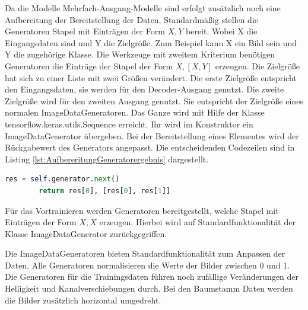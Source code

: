 	Da die Modelle Mehrfach-Ausgang-Modelle sind erfolgt zusätzlich noch eine Aufbereitung der Bereitstellung der Daten. Standardmäßig stellen die Generatoren Stapel mit Einträgen der Form $X ,Y$  bereit. Wobei X die Eingangsdaten sind und Y die Zielgröße. Zum Beispiel kann X ein Bild sein und Y die zugehörige Klasse. Die Werkzeuge mit zweitem Kriterium benötigen Generatoren die Einträge der Stapel der Form $X, [X, Y]$ erzeugen. Die Zielgröße hat sich zu einer Liste mit zwei Größen verändert. Die erste Zielgröße entspricht den Eingangsdaten, sie werden für den Decoder-Ausgang genutzt. Die zweite Zielgröße wird für den zweiten Ausgang genutzt. Sie entspricht der Zielgröße eines normalen ImageDataGeneratoren. Das Ganze wird mit Hilfe der Klasse tensorflow.keras.utils.Sequence erreicht. Ihr wird im Konstruktor ein ImageDataGenerator übergeben. Bei der Bereitstellung eines Elementes wird der Rückgabewert des Generators angepasst. Die entscheidenden Codezeilen sind in Listing \ref{lst:AufbereritungGeneratorergebnis} dargestellt. 
	\begin{lstlisting}[language=python,caption=Aufbereitung Generatorergebnis in Python, label=lst:AufbereritungGeneratorergebnis]
		res = self.generator.next()
		return res[0], [res[0], res[1]]
	\end{lstlisting}
	
	Für das Vortrainieren werden Generatoren bereitgestellt, welche Stapel mit Einträgen der Form $X ,X$ erzeugen. Hierbei wird auf Standardfunktionalität der Klasse ImageDataGenerator zurückgegriffen.
	
	Die ImageDataGeneratoren bieten Standardfunktionalität zum Anpassen der Daten. Alle Generatoren normalisieren die Werte der Bilder zwischen 0 und 1. Die Generatoren für die Trainingsdaten führen noch zufällige Veränderungen der Helligkeit und Kanalverschiebungen durch. Bei den Baumstamm Daten werden die Bilder zusätzlich horizontal umgedreht. 


 


 
